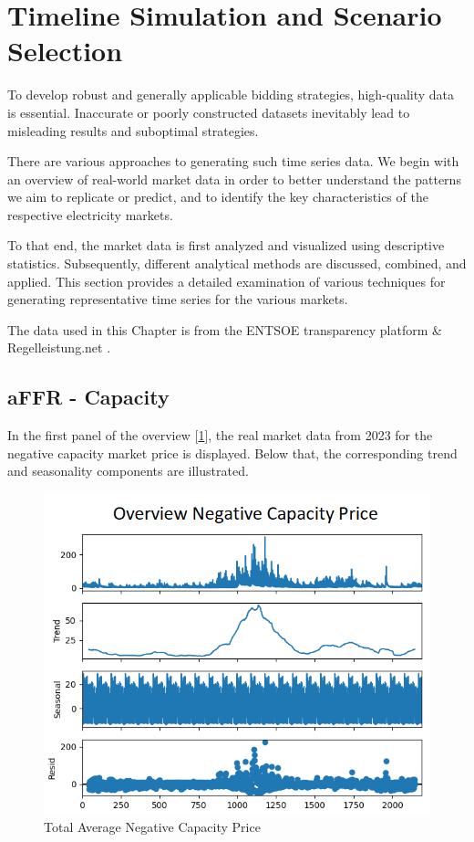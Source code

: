 \section{Timeline Simulation and Scenario Selection}
\label{chap:dataDescription}

To develop robust and generally applicable bidding strategies, high-quality data is essential.
Inaccurate or poorly constructed datasets inevitably lead to misleading results and suboptimal strategies.

There are various approaches to generating such time series data.
We begin with an overview of real-world market data in order to better understand
the patterns we aim to replicate or predict, and to identify the key characteristics
of the respective electricity markets.

To that end, the market data is first analyzed and visualized using descriptive statistics.
Subsequently, different analytical methods are discussed, combined, and applied.
This section provides a detailed examination of various techniques for generating representative time series for the  various markets.

The data used in this Chapter is from the ENTSOE transparency platform \cite{.08.04.2025} \& Regelleistung.net \cite{50HertzTransmissionGmbHAmprionGmbHTenneTTSOGmbH.18.04.2025}.

\subsection{aFFR - Capacity}

In the first panel of the overview [\ref{fig:Overview Average Negativ Capacity Price}],
the real market data from 2023 for the negative capacity market price is displayed.
Below that, the corresponding trend and seasonality components are illustrated.

\begin{figure}[!h]
	\centering
	\includegraphics[width=0.7\linewidth]{pictures/capacityData_overview.png}
	\caption{Total Average Negative Capacity Price}
	\label{fig:Overview Average Negativ Capacity Price}
\end{figure}

